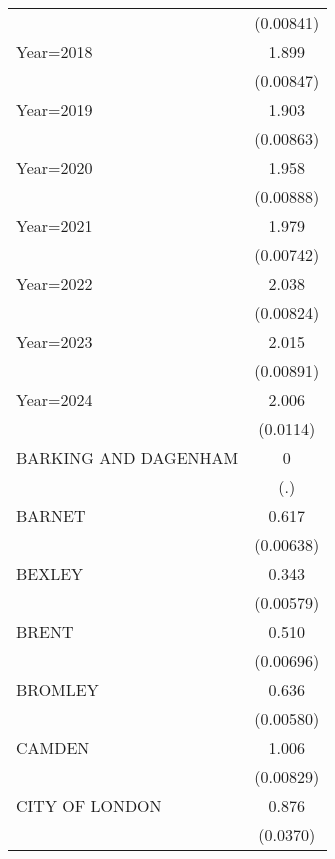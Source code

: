 {\begin{longtable}{l*{1}{c}}
                    &   (0.00841)         \\
\addlinespace
Year=2018           &       1.899\sym{***}\\
                    &   (0.00847)         \\
\addlinespace
Year=2019           &       1.903\sym{***}\\
                    &   (0.00863)         \\
\addlinespace
Year=2020           &       1.958\sym{***}\\
                    &   (0.00888)         \\
\addlinespace
Year=2021           &       1.979\sym{***}\\
                    &   (0.00742)         \\
\addlinespace
Year=2022           &       2.038\sym{***}\\
                    &   (0.00824)         \\
\addlinespace
Year=2023           &       2.015\sym{***}\\
                    &   (0.00891)         \\
\addlinespace
Year=2024           &       2.006\sym{***}\\
                    &    (0.0114)         \\
\addlinespace
BARKING AND DAGENHAM&           0         \\
                    &         (.)         \\
\addlinespace
BARNET              &       0.617\sym{***}\\
                    &   (0.00638)         \\
\addlinespace
BEXLEY              &       0.343\sym{***}\\
                    &   (0.00579)         \\
\addlinespace
BRENT               &       0.510\sym{***}\\
                    &   (0.00696)         \\
\addlinespace
BROMLEY             &       0.636\sym{***}\\
                    &   (0.00580)         \\
\addlinespace
CAMDEN              &       1.006\sym{***}\\
                    &   (0.00829)         \\
\addlinespace
CITY OF LONDON      &       0.876\sym{***}\\
                    &    (0.0370)         \\

\end{longtable}}

